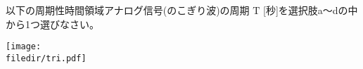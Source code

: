 以下の周期性時間領域アナログ信号(のこぎり波)の周期 $\textrm{T}$ [秒]を選択肢a〜dの中から1つ選びなさい。

\centering\texttt{[image: \\filedir/tri.pdf]}
